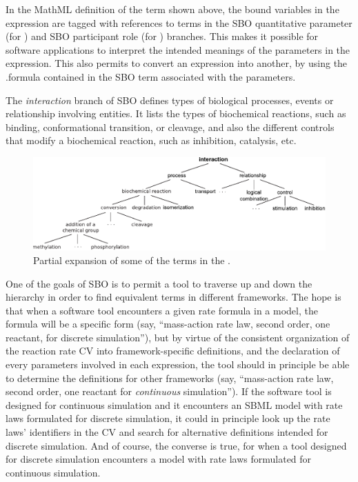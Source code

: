 \begin{blockChanged}
 In the MathML definition of the term shown above, the bound
variables in the  expression are tagged with
references to terms in the SBO quantitative parameter (for
) and SBO participant role (for ) branches.
This makes it possible for software applications to interpret the
intended meanings of the parameters in the expression. This also permits to convert an expression into another, by using the \mathmltwo.formula contained in the SBO term associated with the parameters.

The \emph{interaction} branch of SBO defines types of biological processes, events or relationship involving entities.  It lists the types of biochemical reactions, such as binding,
conformational transition, or cleavage, and also the different
controls that modify a biochemical reaction, such as inhibition,
catalysis, etc.
\end{blockChanged}

\begin{figure}[tbh]
  \centering
  \includegraphics[scale = 0.8]{figs/sbo-interaction}
  \caption{Partial expansion of some of the terms in the .}
  \label{fig:sbo-interaction}
\end{figure}

\begin{blockChanged}
One of the goals of SBO is to permit a tool to traverse up and
down the hierarchy in order to find equivalent terms in different
frameworks.  The hope is that when a software tool encounters a
given rate formula in a model, the formula will be a specific form
(say, ``mass-action rate law, second order, one reactant, for
discrete simulation''), but by virtue of the consistent
organization of the reaction rate CV into framework-specific
definitions, and the declaration of every parameters involved in each expression, the tool should in principle be able to determine the
definitions for other frameworks (say, ``mass-action rate law,
second order, one reactant for \emph{continuous} simulation'').
If the software tool is designed for continuous simulation and it
encounters an SBML model with rate laws formulated for discrete
simulation, it could in principle look up the rate laws'
identifiers in the CV and search for alternative definitions
intended for discrete simulation.  And of course, the converse is
true, for when a tool designed for discrete simulation encounters
a model with rate laws formulated for continuous simulation.
\end{blockChanged}

